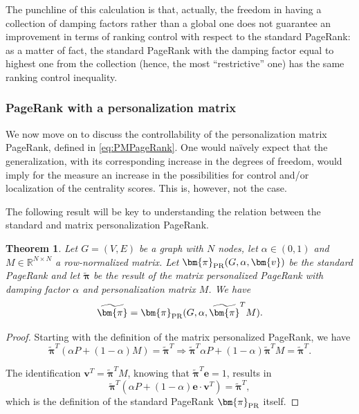 \documentclass[sn-mathphys-ay]{sn-jnl}%
\newcommand{\R}{\mathbb{R}}
\newcommand{\bv}{\bm{v}}
\newcommand{\be}{\mathbf{e}}
\theoremstyle{thmstyleone}%
\newtheorem{theorem}{Theorem}%
\theoremstyle{thmstyletwo}%
\theoremstyle{thmstylethree}%
\begin{document}
The punchline of this calculation is that, actually, the freedom in having a collection of damping factors rather than a global one does not guarantee an improvement in terms of ranking control with respect to the standard PageRank: as a matter of fact, the standard PageRank with the damping factor equal to highest one from the collection (hence, the most ``restrictive'' one) has the same ranking control inequality.


\subsubsection{PageRank with a personalization matrix} \label{subsec:persmatrix}


We now move on to discuss the controllability of the personalization matrix PageRank, defined in \eqref{eq:PMPageRank}. One would naïvely expect that the generalization, with its corresponding increase in the degrees of freedom, would imply for the measure an increase in the possibilities for control and/or localization of the centrality scores. This is, however, not the case.

The following result will be key to understanding the relation between the standard and matrix personalization PageRank.
\begin{theorem}\label{thm:matrixPR}
	Let $G=(V,E)$ be a graph with $N$ nodes, let $\alpha\in(0,1)$ and $M\in\R^{N\times N}$ a row-normalized matrix. Let $\bm{\pi}_{\rm PR}(G,\alpha,\bv)$ be the standard PageRank and let $\widetilde{\bm{\pi}}$ be the result of the matrix personalized PageRank with damping factor $\alpha$ and personalization matrix $M$. We have
	\begin{equation}
		\widetilde{\bm{\pi}} = \bm{\pi}_{\rm PR}(G, \alpha, \widetilde{\bm{\pi}}^T M).
	\end{equation}
\end{theorem}
\begin{proof}
	Starting with the definition of the matrix personalized PageRank, we have
	\begin{equation}
		\widetilde{\bm{\pi}}^T (\alpha P + (1-\alpha) M) = \widetilde{\bm{\pi}}^T \Rightarrow \widetilde{\bm{\pi}}^T \alpha P + (1-\alpha) \widetilde{\bm{\pi}}^T M = \widetilde{\bm{\pi}}^T.
	\end{equation}
	
	The identification $\bv^T = \widetilde{\bm{\pi}}^T M$, knowing that $\widetilde{\bm{\pi}}^T \be =1$, results in
	\begin{equation}
		\widetilde{\bm{\pi}}^T (\alpha P + (1-\alpha) \be \cdot \bv^T) = \widetilde{\bm{\pi}}^T,
	\end{equation}
	which is the definition of the standard PageRank $\bm{\pi}_{\rm PR}$ itself.
\end{proof}
\end{document}
